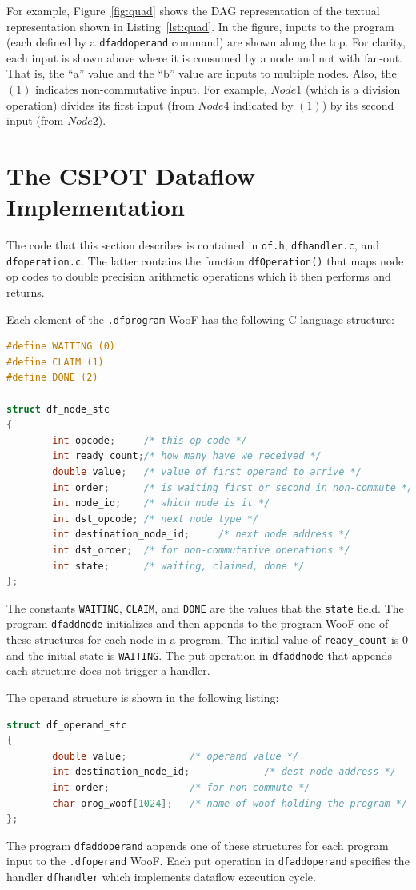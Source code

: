 \documentclass[10pt]{article}
\begin{document}
For example, Figure~\ref{fig:quad} shows the DAG representation of the textual
representation shown in Listing~\ref{lst:quad}.
In the figure, inputs to the program (each defined by a \verb+dfaddoperand+
command) are shown along the top.  For clarity, each input is shown above
where it is consumed by a node and not with fan-out.  
That is, the ``a'' value and the ``b'' value are inputs to multiple nodes.
Also, the $(1)$ indicates non-commutative input.  For example, $Node 1$ (which
is a division operation) divides its first input (from $Node 4$ indicated by
$(1)$) by its second input (from $Node 2$).


\section{The CSPOT Dataflow Implementation}

The code that this section describes is contained in \verb+df.h+,
\verb+dfhandler.c+, and \verb+dfoperation.c+.  The latter contains the function
\verb+dfOperation()+
that maps node op codes to double precision arithmetic operations which it then performs
and returns.

Each element of the \verb+.dfprogram+ WooF has the following C-language
structure:
\begin{lstlisting}[language=C,caption={C structure for node WooF},label={lst:node}]
#define WAITING (0)
#define CLAIM (1)
#define DONE (2)

struct df_node_stc
{
        int opcode;     /* this op code */
        int ready_count;/* how many have we received */
        double value;   /* value of first operand to arrive */
        int order;      /* is waiting first or second in non-commute */
        int node_id;    /* which node is it */
        int dst_opcode; /* next node type */
        int destination_node_id;     /* next node address */
        int dst_order;  /* for non-commutative operations */
        int state;      /* waiting, claimed, done */
};
\end{lstlisting}
The constants \verb+WAITING+, \verb+CLAIM+, and \verb+DONE+ are the values
that the \verb+state+ field.  The program \verb+dfaddnode+ initializes and
then appends to the program WooF one of these structures for each node in a
program.  The initial value of \verb+ready_count+ is $0$ and the initial state
is \verb+WAITING+.  The put operation in \verb+dfaddnode+ that appends each
structure does not trigger a handler.

The operand structure is shown in the following listing:
\begin{lstlisting}[language=C,caption={C structure for operand WooF},label={lst:operand}]
struct df_operand_stc
{
        double value;           /* operand value */
        int destination_node_id;             /* dest node address */
        int order;              /* for non-commute */
        char prog_woof[1024];   /* name of woof holding the program */
};
\end{lstlisting}
The program \verb+dfaddoperand+ appends one of these structures for each
program input to the \verb+.dfoperand+ WooF.  Each put operation in
\verb+dfaddoperand+ specifies the handler \verb+dfhandler+ which implements
dataflow execution cycle. 
\end{document}

